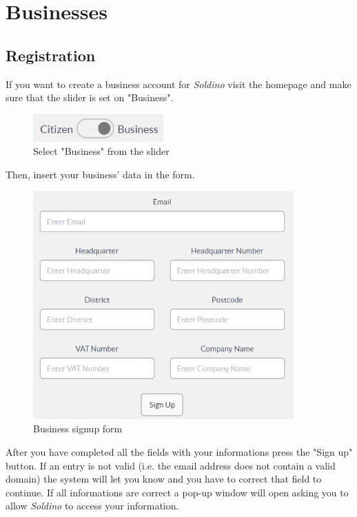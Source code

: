 \section{Businesses}
	\subsection{Registration}
	If you want to create a business account for \textit{Soldino} 
	visit the homepage and make sure that the slider is set on "Business".\\
	\begin{figure}[H]
		\includegraphics[width=5cm]{res/images/user_business.png}
		\centering
		\caption{Select "Business" from the slider}
	\end{figure}	
	\noindent Then, insert your business' data in the form.
	\begin{figure}[H]
		\includegraphics[width=10cm]{res/images/business_signup.png}
		\centering
		\caption{Business signup form}
	\end{figure}
	\noindent After you have completed 
	all the	fields with your informations press the "Sign up" button. If an 
	entry is not valid (i.e. the email address does not contain a valid 
	domain) the system will let you know and you have to correct that field 
	to continue. If all informations are correct a pop-up window will open 
	asking you to allow \textit{Soldino} to access your information.\\
